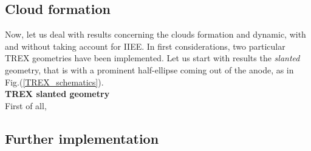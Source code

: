 \subsection{Cloud formation}

Now, let us deal with results concerning the clouds formation and dynamic, with and without taking account for IIEE. In first considerations, two particular TREX geometries have been implemented. Let us start with results the \emph{slanted} geometry, that is with a prominent half-ellipse coming out of the anode, as in Fig.({\ref{TREX_schematics}}).\\

\textbf{TREX slanted geometry}\\

First of all, 

\subsection{Further implementation}